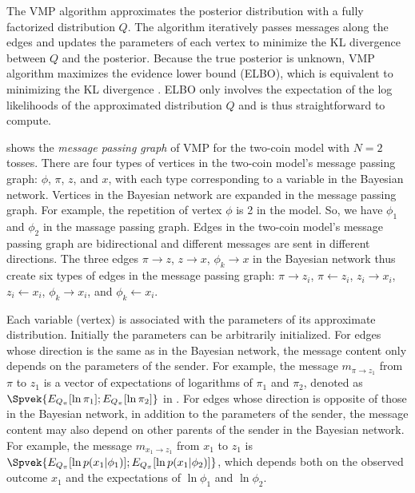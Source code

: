 The VMP algorithm approximates the posterior distribution with a fully
factorized distribution $Q$. 
The algorithm iteratively passes messages along
the edges and updates the parameters of each vertex to minimize the KL divergence
between $Q$ and the posterior.  
Because the true posterior is unknown, VMP algorithm maximizes the
evidence lower bound (ELBO), which is equivalent to minimizing the KL
divergence . ELBO only involves the expectation 
of the log likelihoods of the approximated distribution $Q$ and 
is thus straightforward to compute. 

 shows the \emph{message passing graph} of
VMP for the two-coin model with $N=2$ tosses.
There are four types of vertices in the two-coin model's message passing graph: $\phi$, $\pi$, $z$, and $x$, 
with each type corresponding to a variable in the Bayesian network.
Vertices in the Bayesian network are expanded in the message passing graph.
For example, the repetition of vertex $\phi$ is 2 in the model.
So, we have $\phi_1$ and $\phi_2$ in the massage passing graph.
Edges in the two-coin model's message passing graph are bidirectional
and different messages are sent in different directions.
The three edges $\pi \rightarrow z$, 
$z \rightarrow x$, $\phi_k \rightarrow x$ in the Bayesian network
thus create six types of edges in the message passing graph:
$\pi \rightarrow z_i$, 
$\pi \leftarrow z_i$, 
$z_i \rightarrow x_i$, 
$z_i \leftarrow x_i$, 
$\phi_k \rightarrow x_i$, and
$\phi_k \leftarrow x_i$.

Each variable (vertex) is associated with the parameters of its
approximate distribution. Initially the parameters can be arbitrarily
initialized. For edges whose direction is the same as in the Bayesian network,
the message content only depends on the parameters of the sender.  
For example, the
message $m_{\pi \rightarrow z_1}$ from $\pi$ to $z_1$ is a vector of expectations of logarithms of
$\pi_1$ and $\pi_2$,
denoted as $\Spvek{E_{Q_\pi}[\ln \pi_1];E_{Q_\pi}[\ln \pi_2]}$ in .
For edges whose direction is opposite of those in the
Bayesian network, 
in addition to the parameters of the sender, 
the message content may also depend on other parents of the sender in the Bayesian network. 
For example, the message $m_{x_1 \rightarrow z_1}$ from $x_1$ to $z_1$ is
$\Spvek{E_{Q_\pi}[\ln p(x_1 | \phi_1)];E_{Q_\pi}[\ln p(x_1 | \phi_2)]}$,
which depends both on the observed outcome $x_1$ and the
expectations of $\ln \phi_1$ and $\ln \phi_2$.  


